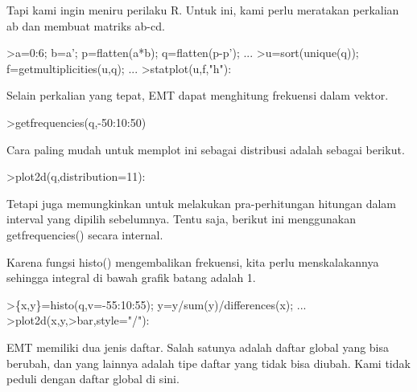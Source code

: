 \documentclass[a4paper,10pt]{article}
\begin{document}
\begin{eulernotebook}
\begin{eulercomment}
\begin{eulercomment}
\begin{eulercomment}
\begin{eulercomment}
\begin{eulercomment}
\begin{eulercomment}
\begin{eulercomment}
\begin{eulercomment}
\begin{eulercomment}
\begin{eulercomment}
\begin{eulercomment}
\begin{eulercomment}
\begin{eulercomment}
\begin{eulercomment}
\begin{eulercomment}
\begin{eulercomment}
\begin{eulercomment}
\begin{eulercomment}
\begin{eulercomment}
Tapi kami ingin meniru perilaku R. Untuk ini, kami perlu meratakan
perkalian ab dan membuat matriks ab-cd.
\end{eulercomment}
\begin{eulerprompt}
>a=0:6; b=a'; p=flatten(a*b); q=flatten(p-p'); ...
>u=sort(unique(q)); f=getmultiplicities(u,q); ...
>statplot(u,f,"h"):
\end{eulerprompt}
\begin{eulercomment}
Selain perkalian yang tepat, EMT dapat menghitung frekuensi dalam
vektor.
\end{eulercomment}
\begin{eulerprompt}
>getfrequencies(q,-50:10:50)
\end{eulerprompt}
\begin{euleroutput}
  [0,  23,  132,  316,  602,  801,  333,  141,  53,  0]
\end{euleroutput}
\begin{eulercomment}
Cara paling mudah untuk memplot ini sebagai distribusi adalah sebagai
berikut.
\end{eulercomment}
\begin{eulerprompt}
>plot2d(q,distribution=11):
\end{eulerprompt}
\begin{eulercomment}
Tetapi juga memungkinkan untuk melakukan pra-perhitungan hitungan
dalam interval yang dipilih sebelumnya. Tentu saja, berikut ini
menggunakan getfrequencies() secara internal.

Karena fungsi histo() mengembalikan frekuensi, kita perlu
menskalakannya sehingga integral di bawah grafik batang adalah 1.
\end{eulercomment}
\begin{eulerprompt}
>\{x,y\}=histo(q,v=-55:10:55); y=y/sum(y)/differences(x); ...
>plot2d(x,y,>bar,style="/"):
\end{eulerprompt}
\begin{eulercomment}
EMT memiliki dua jenis daftar. Salah satunya adalah daftar global yang
bisa berubah, dan yang lainnya adalah tipe daftar yang tidak bisa
diubah. Kami tidak peduli dengan daftar global di sini.


\end{eulercomment}
\end{eulercomment}
\end{eulercomment}
\end{eulercomment}
\end{eulercomment}
\end{eulercomment}
\end{eulercomment}
\end{eulercomment}
\end{eulercomment}
\end{eulercomment}
\end{eulercomment}
\end{eulercomment}
\end{eulercomment}
\end{eulercomment}
\end{eulercomment}
\end{eulercomment}
\end{eulercomment}
\end{eulercomment}
\end{eulercomment}
\end{eulernotebook}
\end{document}
